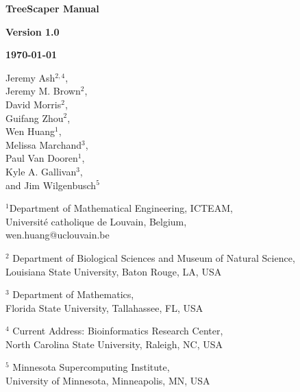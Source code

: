 \documentclass[11pt]{article}
\theoremstyle{definition}
\theoremstyle{remark}
\theoremstyle{plain}
\begin{document}

\begin{titlepage} 

\centering
	{\huge\bfseries TreeScaper Manual \par}
	\vspace{1cm}
	{\LARGE\bfseries Version 1.0\par}
	\vspace{1cm}
	{\Large\bfseries \today\par}
	\vspace{1.5cm}
	{\Large Jeremy Ash$^{2,4}$, \\ Jeremy M. Brown$^{2}$, \\ David Morris$^{2}$, \\ Guifang Zhou$^{2}$, \\ Wen Huang$^{1}$, \\ Melissa Marchand$^{3}$, \\ Paul Van Dooren$^{1}$, \\ Kyle A. Gallivan$^{3}$, \\ and Jim Wilgenbusch$^{5}$\par}
	\vspace{3.5cm}
	{\small $^{1}$Department of Mathematical Engineering, ICTEAM, \\ Universit\'{e} catholique de Louvain, Belgium, \\ wen.huang@uclouvain.be \par}
	\vspace{0.5cm}
	{\small $^{2}$ Department of Biological Sciences and Museum of Natural Science, \\ Louisiana State University, Baton Rouge, LA, USA \par}
	\vspace{0.5cm}
	{\small $^{3}$ Department of Mathematics, \\ Florida State University, Tallahassee, FL, USA \par}
	\vspace{0.5cm}
	{\small $^{4}$ Current Address: Bioinformatics Research Center, \\ North Carolina State University, Raleigh, NC, USA \par}
	\vspace{0.5cm}
	{\small $^{5}$ Minnesota Supercomputing Institute, \\ University of Minnesota, Minneapolis, MN, USA \par}
	\vfill


	

\end{titlepage}
\end{document}
